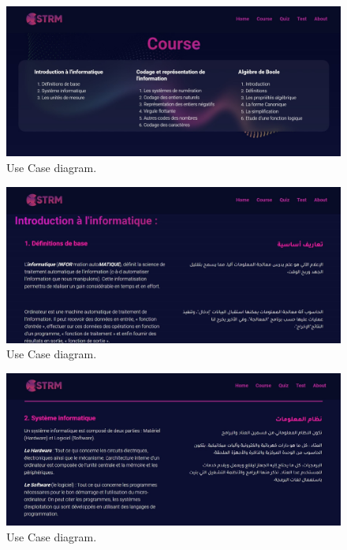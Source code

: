 \begin{figure}[ht]
	\centering
	\label{}\includegraphics[scale=0.5]{img/3.jpg}                
	\caption{Use Case diagram.} 
	\label{fig:UseCaseD}
\end{figure} 


\begin{figure}[ht]
	\centering
	\label{}\includegraphics[scale=0.5]{img/4.jpg}                
	\caption{Use Case diagram.} 
	\label{fig:UseCaseD}
\end{figure} 

\newpage

\begin{figure}[ht]
	\centering
	\label{}\includegraphics[scale=0.5]{img/5.jpg}                
	\caption{Use Case diagram.} 
	\label{fig:UseCaseD}
\end{figure} 

